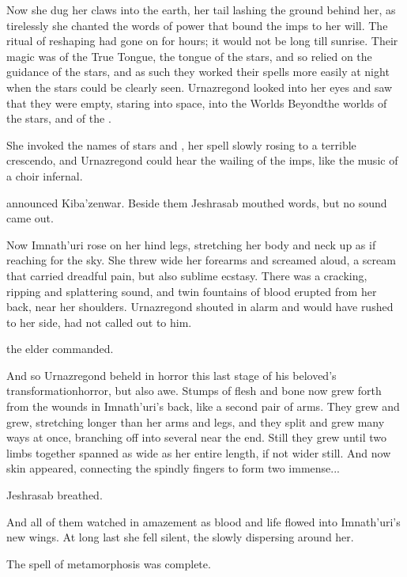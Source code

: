 Now she dug her claws into the earth, her tail lashing the ground behind her, as tirelessly she chanted the words of power that bound the imps to her will. The ritual of reshaping had gone on for hours; it would not be long till sunrise. Their magic was of the True Tongue, the tongue of the stars, and so relied on the guidance of the stars, and as such they worked their spells more easily at night when the stars could be clearly seen. Urnazregond looked into her eyes and saw that they were empty, staring into space, into the Worlds Beyond\dash the worlds of the stars, and of the \daemons. 

 She invoked the names of stars and \daemons, her spell slowly rosing to a terrible crescendo, and Urnazregond could hear the wailing of the imps, like the music of a choir infernal. 

 announced Kiba'zenwar\dash\HesodN. Beside them Jeshrasab mouthed words, but no sound came out. 

Now Imnath'uri rose on her hind legs, stretching her body and neck up as if reaching for the sky. She threw wide her forearms and screamed aloud, a scream that carried dreadful pain, but also sublime ecstasy. There was a cracking, ripping and splattering sound, and twin fountains of blood erupted from her back, near her shoulders. Urnazregond shouted in alarm and would have rushed to her side, had not \HesodN{} called out to him. 

 the elder commanded. 

And so Urnazregond beheld in horror this last stage of his beloved's transformation\dash horror, but also awe. Stumps of flesh and bone now grew forth from the wounds in Imnath'uri's back, like a second pair of arms. They grew and grew, stretching longer than her arms and legs, and they split and grew many ways at once, branching off into several  near the end. Still they grew until two limbs together spanned as wide as her entire length, if not wider still. And now skin appeared, connecting the spindly fingers to form two immense...

 Jeshrasab breathed.  

And all of them watched in amazement as blood and life flowed into Imnath'uri's new wings. At long last she fell silent, the \daemons{} slowly dispersing around her. 

The spell of metamorphosis was complete. 

